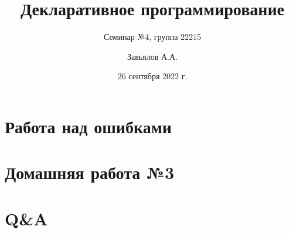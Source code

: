 \documentclass{beamer}
\title{Декларативное программирование}
\subtitle{Семинар №4, группа 22215}
\author{Завьялов А.А.}
\date{26 сентября 2022 г.}
\institute{Кафедра систем информатики ФИТ НГУ}
\begin{document}
  \maketitle
  \addtocounter{framenumber}{1}
  \section{Работа над ошибками}
  \section{Домашняя работа №3}
  \section{Q\&A}
\end{document}
